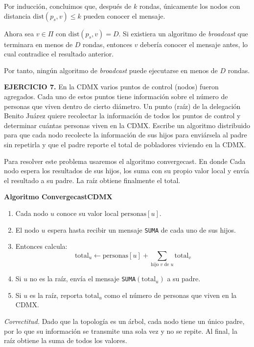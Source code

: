 \documentclass[12pt]{article}
\begin{document}
Por inducción, concluimos que, después de $k$ rondas, 
únicamente los nodos con distancia $\mathrm{dist}(p_s,v) \leq k$ 
pueden conocer el mensaje. 

Ahora sea $v \in \Pi$ con $\mathrm{dist}(p_s,v) = D$. 
Si existiera un algoritmo de \textit{broadcast} que terminara en 
menos de $D$ rondas, entonces $v$ debería conocer el mensaje antes, 
lo cual contradice el resultado anterior. 

Por tanto, ningún algoritmo de \textit{broadcast} puede ejecutarse 
en menos de $D$ rondas. 

\begin{ejercicio}
\noindent \textbf{EJERCICIO 7.} 
En la CDMX varios puntos de control (nodos) fueron agregados. Cada uno de
estos puntos tiene información sobre el número de personas que viven dentro de cierto diámetro.
Un punto (raíz) de la delegación Benito Juárez quiere recolectar la información de todos los puntos de control y determinar cuántas personas viven en la CDMX. Escribe un algoritmo distribuido para que cada nodo recolecte la información de sus hijos para enviársela al padre sin repetirla y que el padre reporte el total de pobladores viviendo en la CDMX. \\
\end{ejercicio}
Para resolver este problema usaremos el algoritmo convergecast. En donde Cada nodo espera los resultados de sus hijos, los suma con su propio valor local 
y envía el resultado a su padre. La raíz obtiene finalmente el total.

\textbf{Algoritmo ConvergecastCDMX}
\begin{enumerate}
  \item Cada nodo $u$ conoce su valor local $\text{personas}[u]$.
  \item El nodo $u$ espera hasta recibir un mensaje \texttt{SUMA} de cada uno de sus hijos.
  \item Entonces calcula:
  \[
    \text{total}_u \leftarrow \text{personas}[u] 
      + \sum_{\text{hijo } v \text{ de } u} \text{total}_v
  \]
  \item Si $u$ no es la raíz, envía el mensaje 
  \texttt{SUMA}$(\text{total}_u)$ a su padre.
  \item Si $u$ es la raíz, reporta $\text{total}_u$ como el número de 
  personas que viven en la CDMX.
\end{enumerate}

\medskip

\textit{Correctitud.} Dado que la topología es un árbol, cada nodo tiene un único padre, 
por lo que su información se transmite una sola vez y no se repite. 
Al final, la raíz obtiene la suma de todos los valores.
\end{document}
